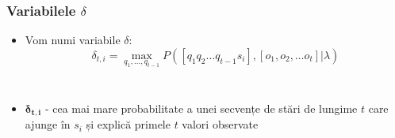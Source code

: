 \begin{frame}
  \frametitle{Variabilele $\delta$}
  \begin{itemize}
  \item Vom numi variabile $\delta$:
    \begin{equation}
      \label{eq:delta-definition}
      \delta_{t,i}=\underset{q_1,\ldots,q_{t-1}}{\operatorname{max}}
      P([q_1 q_2 \ldots q_{t-1} s_i], [o_1, o_2, \ldots o_t] \vert \lambda)
    \end{equation}
  \end{itemize}
  \begin{columns}
    \begin{itemize}
    \item $\mathbf{\delta_{t,i}}$ - cea mai mare probabilitate a unei secvențe de 
      stări de lungime $t$ care ajunge în $s_i$ și explică primele $t$ valori observate
    \end{itemize}
     
  \end{columns}
\end{frame}

